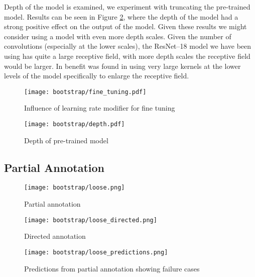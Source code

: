 Depth of the model is examined, we experiment with truncating the pre-trained model. Results can be seen in Figure \ref{fig:bootstrap_depth}, where the depth of the model had a strong positive effect on the output of the model. Given these results we might consider using a model with even more depth scales. Given the number of convolutions (especially at the lower scales), the ResNet--18 model we have been using has quite a large receptive field, with more depth scales the receptive field would be larger. In \cite{Peng2017} benefit was found in using very large kernels at the lower levels of the model specifically to enlarge the receptive field.

\begin{figure*}[!ht]
\centering
\begin{subfigure}{.5\textwidth}
  \centering
  \texttt{[image: bootstrap/fine\_tuning.pdf]}
  \caption{Influence of learning rate modifier for fine tuning}  
  \label{fig:bootstrap_fine}
\end{subfigure}%
\begin{subfigure}{.5\textwidth}
  \centering
  \texttt{[image: bootstrap/depth.pdf]}
  \caption{Depth of pre-trained model}  
  \label{fig:bootstrap_depth}
\end{subfigure}

\label{fig:bootstrap_training}
\end{figure*}




\subsection {Partial Annotation}


\begin{figure*}[!ht]
\centering
\begin{subfigure}[t]{.3\textwidth}
  \centering
  \texttt{[image: bootstrap/loose.png]}
  \caption{Partial annotation}
  \label{fig:bootstrap_loose_annot}
\end{subfigure}%
\begin{subfigure}[t]{.3\textwidth}
  \centering
  \texttt{[image: bootstrap/loose\_directed.png]}
  \caption{Directed annotation}
  \label{fig:bootstrap_loose_dir}

\end{subfigure}%
\begin{subfigure}[t]{.3\textwidth}
  \centering
  \texttt{[image: bootstrap/loose\_predictions.png]}
  \caption{Predictions from partial annotation showing failure cases}
  \label{fig:bootstrap_loose_pred}
\end{subfigure}
  \caption{Loose annotation methods, red overlay refers to pixels labelled as background where transparent pixels are unlabelled}


\end{figure*}

